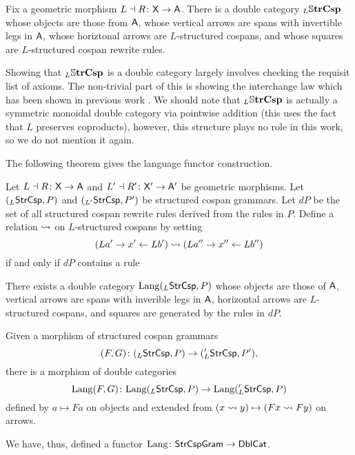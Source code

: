 \documentclass{amsart}
\begin{document}
\begin{definition}\label{df:L_SSStrCsp}
  Fix a geometric morphism $L\dashv R \colon \mathsf{X} \to
  \mathsf{A}$. There is a double category $_L\mathbb{S} \mathbf{trCsp}$ whose
  objects are those from $\mathsf{A}$, whose vertical arrows are
  spans with invertible legs in $\mathsf{A}$, whose horiztonal
  arrows are $L$-structured cospans, and whose squares
  are $L$-structured cospan rewrite rules.    
\end{definition}

Showing that $_L\mathbb{S} \mathbf{trCsp}$ is a double category
largely involves checking the requisit list of
axioms. The non-trivial part of this is showing
the interchange law which has been shown in
previous work \cite[Lem.~4.2,
Lem.~4.3]{CicCour_SpCspTopos}. We should note that
$ _L\mathbb{S} \mathbf{trCsp} $ is actually a symmetric monoidal
double category via pointwise addition
\cite[Lem.~4.4]{CicCour_SpCspTopos} (this uses the
fact that $ L $ preserves coproducts), however,
this structure plays no role in this work, so we
do not mention it again.

The following theorem gives the language
functor construction.

\begin{theorem}
  \label{thm:StrCsp_Lang_functorial}
  Let $ L \dashv R \colon \mathsf{X} \to \mathsf{A} $ and
  $ L' \dashv R' \colon \mathsf{X}' \to \mathsf{A}' $ be geometric
  morphisms. Let $ (_L\mathsf{StrCsp},P) $ and
  $ ( _{L'}\mathsf{StrCsp},P' ) $ be structured cospan
  grammars. Let $ dP $ be the set of all
  structured cospan rewrite rules derived from the
  rules in $ P $. Define a relation
  $ \rightsquigarrow $ on $ L $-structured cospans by
  setting
  $$ ( La' \to x' \leftarrow Lb' ) \rightsquigarrow ( La'' \to x''
    \leftarrow Lb'' ) $$ if and only if $ dP $ contains a rule
  
  
  There exists a double category
  $ \mathrm{Lang} (_L\mathsf{StrCsp} , P) $ whose objects are
  those of $ \mathsf{A} $, vertical arrows are spans with
  inverible legs in $ \mathsf{A} $, horizontal arrows are
  $ L $-structured cospans, and
  squares are generated by the rules in $ dP $.

  Given a morphism of structured cospan grammars
  $$ (F,G) \colon (_L \mathsf{StrCsp}, P) \to ({_L'}\mathsf{StrCsp} , P'), $$
  there is a morphism of double categories
  $$ \mathrm{Lang} (F,G) \colon \mathrm{Lang} (_L \mathsf{StrCsp}, P) \to \mathrm{Lang} (_L'
  \mathsf{StrCsp}, P) $$ defined by $ a \mapsto Fa $ on objects and
  extended from
  $ (x \rightsquigarrow y) \mapsto ( Fx \rightsquigarrow Fy ) $ on
  arrows.

  We have, thus, defined a functor
  $ \mathrm{Lang} \colon \mathsf{StrCspGram} \to \mathsf{DblCat} $.
\end{theorem}
\end{document}
